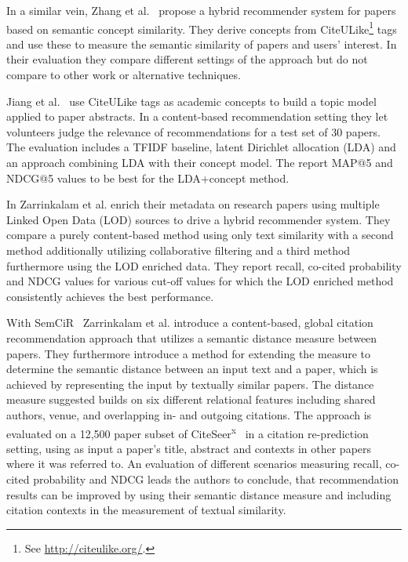 In a similar vein, Zhang et al.~\cite{Zhang2008} propose a hybrid recommender system for papers based on semantic concept similarity. They derive concepts from CiteULike\footnote{See \url{http://citeulike.org/}.} tags and use these to measure the semantic similarity of papers and users' interest. In their evaluation they compare different settings of the approach but do not compare to other work or alternative techniques.

Jiang et al.~\cite{Jiang2012} use CiteULike tags as academic concepts to build a topic model applied to paper abstracts. In a content-based recommendation setting they let volunteers judge the relevance of recommendations for a test set of 30 papers. The evaluation includes a TFIDF baseline, latent Dirichlet allocation (LDA) and an approach combining LDA with their concept model. The report MAP@5 and NDCG@5 values to be best for the LDA+concept method.

In \cite{Zarrinkalam2012} Zarrinkalam et al. enrich their metadata on research papers using multiple Linked Open Data (LOD) sources to drive a hybrid recommender system. They compare a purely content-based method using only text similarity with a second method additionally utilizing collaborative filtering and a third method furthermore using the LOD enriched data. They report recall, co-cited probability and NDCG values for various cut-off values for which the LOD enriched method consistently achieves the best performance.

With SemCiR~\cite{Zarrinkalam2013} Zarrinkalam et al. introduce a content-based, global citation recommendation approach that utilizes a semantic distance measure between papers. They furthermore introduce a method for extending the measure to determine the semantic distance between an input text and a paper, which is achieved by representing the input by textually similar papers. The distance measure suggested builds on six different relational features including shared authors, venue, and overlapping in- and outgoing citations. The approach is evaluated on a 12,500 paper subset of CiteSeer\textsuperscript{x}~\cite{Caragea2014} in a citation re-prediction setting, using as input a paper's title, abstract and contexts in other papers where it was referred to. An evaluation of different scenarios measuring recall, co-cited probability and NDCG leads the authors to conclude, that recommendation results can be improved by using their semantic distance measure and including citation contexts in the measurement of textual similarity.

